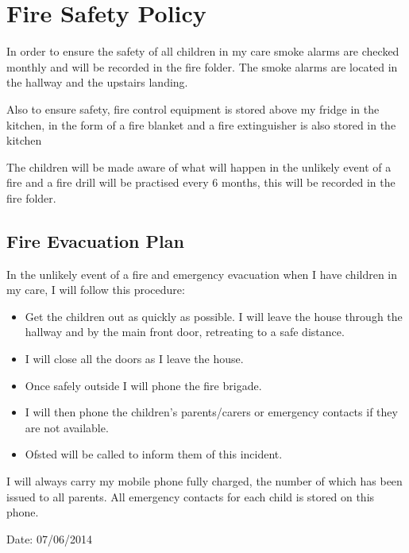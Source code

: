 
\section{Fire Safety Policy}

In order to ensure the safety of all children in my care smoke alarms
are checked monthly and will be recorded in the fire folder. The smoke
alarms are located in the hallway and the upstairs landing.

Also to ensure safety, fire control equipment is stored above my fridge
in the kitchen, in the form of a fire blanket and a fire extinguisher is
also stored in the kitchen

The children will be made aware of what will happen in the unlikely
event of a fire and a fire drill will be practised every 6 months, this
will be recorded in the fire folder.

\subsection{Fire Evacuation Plan}

In the unlikely event of a fire and emergency evacuation when I have
children in my care, I will follow this procedure:

\begin{itemize}
\item
  Get the children out as quickly as possible. I will leave the house
  through the hallway and by the main front door, retreating to a safe
  distance.
\item
  I will close all the doors as I leave the house.
\item
  Once safely outside I will phone the fire brigade.
\item
  I will then phone the children's parents/carers or emergency contacts
  if they are not available.
\item
  Ofsted will be called to inform them of this incident.
\end{itemize}

I will always carry my mobile phone fully charged, the number of which
has been issued to all parents. All emergency contacts for each child is
stored on this phone.

Date: 07/06/2014


